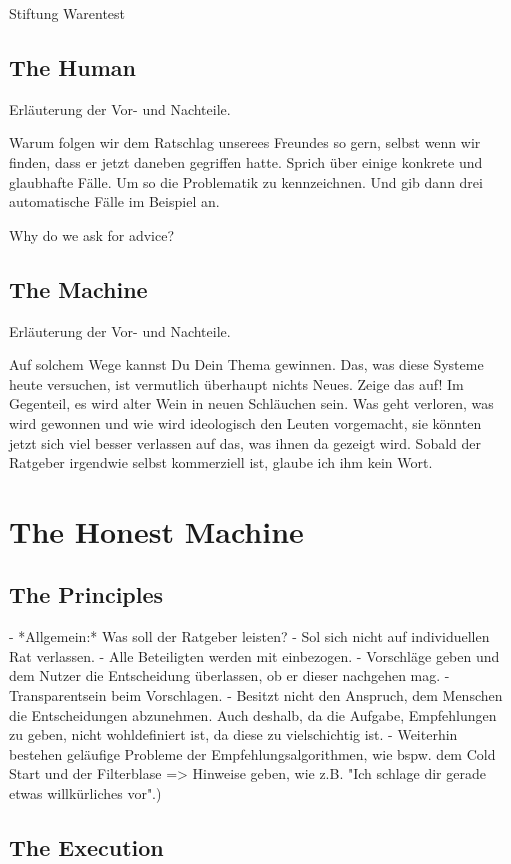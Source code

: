 \documentclass[12pt,numbers=noenddot,parskip,bibliography=totocnumbered,listof=totocnumbered]{scrreprt}
\begin{document}
Stiftung Warentest

\section{The Human}
Erläuterung der Vor- und Nachteile.

Warum folgen wir dem Ratschlag unserees Freundes so gern, selbst wenn wir finden, dass er jetzt daneben gegriffen hatte. Sprich über einige konkrete und glaubhafte Fälle. Um so die Problematik zu kennzeichnen. Und gib dann drei automatische Fälle im Beispiel an.


Why do we ask for advice?


\section{The Machine}
Erläuterung der Vor- und Nachteile.

Auf solchem Wege kannst Du Dein Thema gewinnen. Das, was diese Systeme heute versuchen, ist vermutlich überhaupt nichts Neues. Zeige das auf! Im Gegenteil, es wird alter Wein in neuen Schläuchen sein. Was geht verloren, was wird gewonnen und wie wird ideologisch den Leuten vorgemacht, sie könnten jetzt sich viel besser verlassen auf das, was ihnen da gezeigt wird.  Sobald der Ratgeber irgendwie selbst kommerziell ist, glaube ich ihm kein Wort.

\chapter{The Honest Machine}

\section{The Principles}

- *Allgemein:* Was soll der Ratgeber leisten? 
- Sol sich nicht auf individuellen Rat verlassen.
- Alle Beteiligten werden mit einbezogen.
- Vorschläge geben und dem Nutzer die Entscheidung überlassen, ob er dieser nachgehen mag.
- Transparentsein beim Vorschlagen.
- Besitzt nicht den Anspruch, dem Menschen die Entscheidungen abzunehmen. Auch deshalb, da die Aufgabe, Empfehlungen zu geben, nicht wohldefiniert ist, da diese zu vielschichtig ist.
- Weiterhin bestehen geläufige Probleme der Empfehlungsalgorithmen, wie bspw. dem Cold Start und der Filterblase => Hinweise geben, wie z.B. "Ich schlage dir gerade etwas willkürliches vor".)
\section{The Execution}
\end{document}
